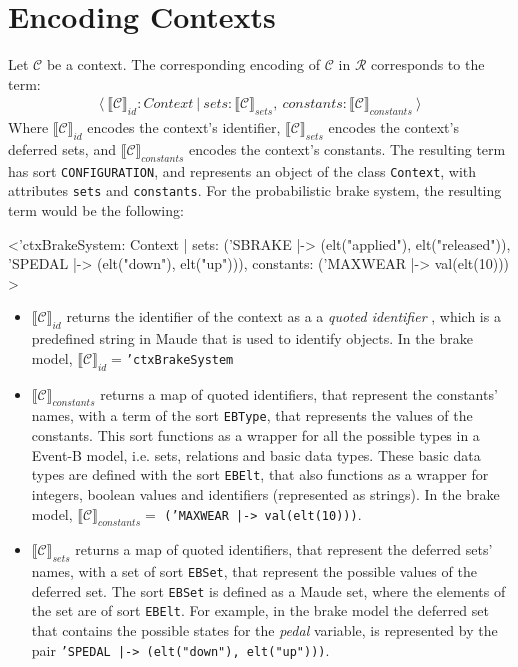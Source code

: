 \section{Encoding Contexts}
Let $\mathscr{C}$ be a context. The corresponding encoding of $\mathscr{C}$ in $\mathscr{R}$ corresponds to the term:
    \begin{align*}
    \langle \ \llbracket \mathscr{C} \rrbracket_{id} : Context \ | \ sets: \llbracket \mathscr{C} \rrbracket_{sets} , \ constants: \llbracket \mathscr{C} \rrbracket_{constants} \ \rangle
    \end{align*}   
Where $\llbracket \mathscr{C} \rrbracket_{id}$ encodes the context's identifier, $\llbracket \mathscr{C} \rrbracket_{sets}$ encodes the context's deferred sets, and $\llbracket \mathscr{C} \rrbracket_{constants}$ encodes the context's constants. The resulting term has sort \texttt{CONFIGURATION}, and represents an object of the class \texttt{Context}, with attributes \texttt{sets} and \texttt{constants}. For the probabilistic brake system, the resulting term would be the following:
\begin{maude}

<'ctxBrakeSystem: Context | 
                  sets: ('SBRAKE |-> (elt("applied"), elt("released")), 
                         'SPEDAL |-> (elt("down"), elt("up"))),
                  constants: ('MAXWEAR |-> val(elt(10))) >
\end{maude}
\begin{itemize}
    \item $\llbracket \mathscr{C} \rrbracket_{id}$ returns the identifier of the context as a a \textit{quoted identifier} \cite{MaudeManual}, which is a predefined string in Maude that is used to identify objects. In the brake model, $\llbracket \mathscr{C} \rrbracket_{id} = $\texttt{'ctxBrakeSystem}
    \item $\llbracket \mathscr{C} \rrbracket_{constants}$ returns a map of quoted identifiers, that represent the constants' names, with a term of the sort \texttt{EBType}, that represents the values of the constants. This sort functions as a wrapper for all the possible types in a Event-B model, i.e. sets, relations and basic data types. These basic data types are defined with the sort \texttt{EBElt}, that also functions as a wrapper for integers, boolean values and identifiers (represented as strings).  In the brake model, $\llbracket \mathscr{C} \rrbracket_{constants} = $ \texttt{('MAXWEAR |-> val(elt(10)))}.
    
    \item $\llbracket \mathscr{C} \rrbracket_{sets}$ returns a map of quoted identifiers, that represent the deferred sets' names, with a set of sort \texttt{EBSet}, that represent the possible values of the deferred set. The sort \texttt{EBSet} is defined as a Maude set, where the elements of the set are of sort \texttt{EBElt}. For example, in the brake model the deferred set that contains the possible states for the \textit{pedal} variable, is represented by the pair \texttt{'SPEDAL |-> (elt("down"), elt("up")))}.
\end{itemize}

